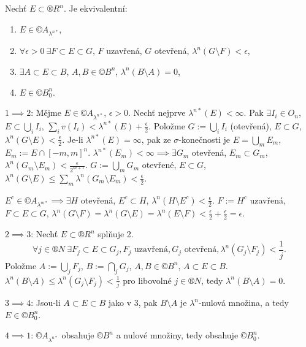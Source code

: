 \documentclass[12pt]{article}					%
\begin{document}
\begin{veta}
	Nechť $E \subset ®R^n$. Je ekvivalentní:
	
	\begin{enumerate}
		\item $E \in ©A_{\lambda^{n*}}$,
		\item $\forall \epsilon > 0 \ \exists F \subset E \subset G$, $F$ uzavřená, $G$ otevřená, $\lambda^n(G \setminus F) < \epsilon$,
		\item $\exists A \subset E \subset B$, $A, B \in ©B^n$, $\lambda^n(B \setminus A) = 0$,
		\item $E \in ©B_0^n$.
	\end{enumerate}

	\begin{dukazin}
		$1 \implies 2$: Mějme $E \in ©A_{\lambda^{n*}}$, $\epsilon > 0$. Nechť nejprve $\lambda^{n*}(E) < ∞$. Pak $\exists I_i \in O_n$, $E \subset \bigcup_i I_i$, $\sum_i v(I_i) < \lambda^{n*}(E) + \frac{\epsilon}{2}$. Položme $G := \bigcup_i I_i$ (otevřená), $E \subset G$, $\lambda^n(G \setminus E) < \frac{\epsilon}{2}$. Je-li $\lambda^{n*}(E) = ∞$, pak ze $\sigma$-konečnosti je $E = \bigcup_m E_m$, $E_m := E \cap [-m, m]^n$. $\lambda^{n*}(E_m) < ∞ \implies \exists G_m$ otevřená, $E_m \subset G_m$, $\lambda^n(G_m \setminus E_m) < \frac{\epsilon}{2^{m+1}}$. $G := \bigcup_m G_m$ otevřené, $E \subset G$, $\lambda^n(G \setminus E) ≤ \sum_m \lambda^n(G_m \setminus E_m) < \frac{\epsilon}{2}$.

		$E^c \in ©A_{\lambda^{m*}} \implies \exists H$ otevřená, $E^c \subset H$, $\lambda^n(H \setminus E^c) < \frac{\epsilon}{2}$. $F:= H^c$ uzavřená, $F \subset E \subset G$, $\lambda^n(G \setminus F) = \lambda^n(G \setminus E) = \lambda^n(E \setminus F) < \frac{\epsilon}{2} + \frac{\epsilon}{2} = \epsilon$.

		$2 \implies 3$: Nechť $E \subset ®R^n$ splňuje 2.
		$$ \forall j \in ®N \ \exists F_j \subset E \subset G_j, F_j \text{ uzavřená}, G_j \text{ otevřená}, \lambda^n(G_j \setminus F_j) < \frac{1}{j}. $$
		Položme $A := \bigcup_j F_j$, $B := \bigcap_j G_j$, $A, B \in ©B^n$, $A \subset E \subset B$. $\lambda^n(B \setminus A)  ≤ \lambda^n(G_j \setminus F_j) < \frac{1}{j}$ pro libovolné $j \in ®N$, tedy $\lambda^n(B \setminus A) = 0$.

		$3 \implies 4$: Jsou-li $A \subset E \subset B$ jako v 3, pak $B \setminus A$ je $\lambda^n$-nulová množina, a tedy $E \in ©B_0^n$.

		$4 \implies 1$: $©A_{\lambda^{n*}}$ obsahuje $©B^n$ a nulové množiny, tedy obsahuje $©B_0^n$.
	\end{dukazin}
\end{veta}
\end{document}
